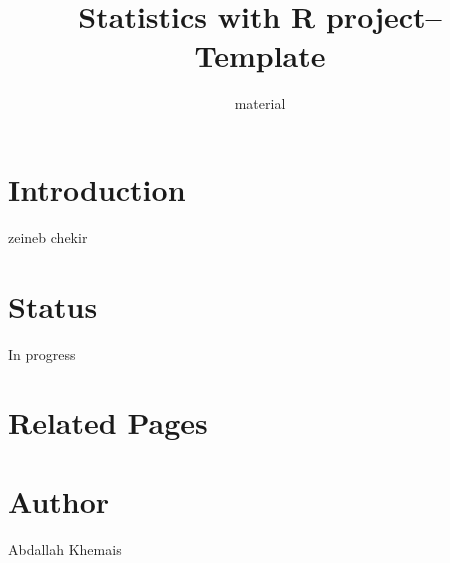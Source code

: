 \documentclass[
  a4paper,
  DIV=11,
  numbers=noendperiod]{scrartcl}
\title{Statistics with R project-- Template}
\subtitle{material}
\author{}
\date{}
\begin{document}
\maketitle


\section{Introduction}\label{introduction}

zeineb chekir

\section{Status}\label{status}

In progress

\section{Related Pages}\label{related-pages}

\section{Author}\label{author}

Abdallah Khemais
\end{document}
